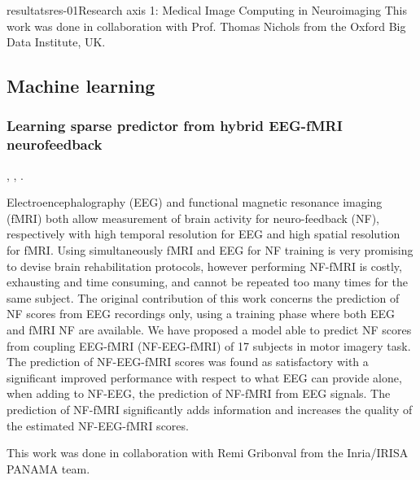 \documentclass{ra2018}
\begin{document}
\begin{module}{resultats}{res-01}{Research axis 1: Medical Image Computing in Neuroimaging}
This work was done in collaboration with Prof. Thomas Nichols from the Oxford Big Data Institute, UK.

\subsection{Machine learning}

\subsubsection{Learning sparse predictor from hybrid EEG-fMRI neurofeedback}
\begin{participants}
      ,
     ,
	.
\end{participants}
Electroencephalography (EEG) and functional magnetic resonance  imaging  (fMRI)  both  allow  measurement  of  brain  activity  for neuro-feedback (NF), respectively with high temporal resolution for EEG and  high  spatial  resolution  for  fMRI.  Using  simultaneously  fMRI  and EEG  for  NF  training  is  very  promising  to  devise  brain  rehabilitation protocols, however performing NF-fMRI is costly, exhausting and time consuming, and cannot be repeated too many times for the same subject. The original contribution of this work concerns the prediction of NF scores from EEG recordings only, using a training phase where both EEG and fMRI NF are available. We have proposed a model able to predict NF scores from coupling EEG-fMRI (NF-EEG-fMRI) of 17 subjects in motor imagery task. The prediction of NF-EEG-fMRI scores was found as satisfactory with a significant improved performance with respect to what EEG can provide alone, when adding to NF-EEG, the prediction of NF-fMRI from EEG signals. The prediction of NF-fMRI significantly adds information and increases the quality of the estimated NF-EEG-fMRI scores.

This work was done in collaboration with Remi Gribonval from the Inria/IRISA PANAMA team.

\end{module}
\end{document}
